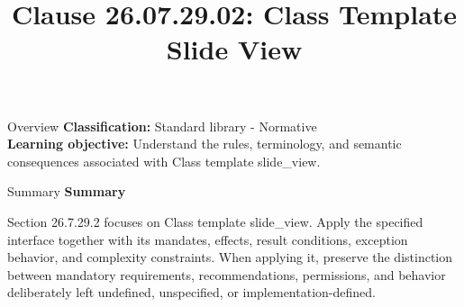\documentclass[10pt,letterpaper]{article}
\title{Clause 26.07.29.02: Class Template Slide View}
\author{}
\date{}
\begin{document}
\maketitle
\begin{CornellOverviewBox}{Overview}
\textbf{Classification:} Standard library - Normative\\[2pt]
\textbf{Learning objective:} Understand the rules, terminology, and semantic consequences associated with Class template slide\_view.
\end{CornellOverviewBox}\begin{CornellSummaryBox}{Summary}
{\sffamily\bfseries\color{Accent} Summary}\par\vspace{3pt}Section 26.7.29.2 focuses on Class template slide\_view. Apply the specified interface together with its mandates, effects, result conditions, exception behavior, and complexity constraints. When applying it, preserve the distinction between mandatory requirements, recommendations, permissions, and behavior deliberately left undefined, unspecified, or implementation-defined.
\end{CornellSummaryBox}
\end{document}
